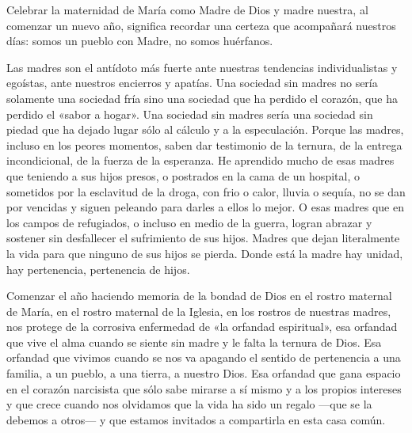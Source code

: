 \documentclass[]{article}
\begin{document}
Celebrar la maternidad de María como Madre de Dios y madre nuestra, al
comenzar un nuevo año, significa recordar una certeza que acompañará
nuestros días: somos un pueblo con Madre, no somos huérfanos.

Las madres son el antídoto más fuerte ante nuestras tendencias
individualistas y egoístas, ante nuestros encierros y apatías. Una
sociedad sin madres no sería solamente una sociedad fría sino una
sociedad que ha perdido el corazón, que ha perdido el «sabor a hogar».
Una sociedad sin madres sería una sociedad sin piedad que ha dejado
lugar sólo al cálculo y a la especulación. Porque las madres, incluso en
los peores momentos, saben dar testimonio de la ternura, de la entrega
incondicional, de la fuerza de la esperanza. He aprendido mucho de esas
madres que teniendo a sus hijos presos, o postrados en la cama de un
hospital, o sometidos por la esclavitud de la droga, con frio o calor,
lluvia o sequía, no se dan por vencidas y siguen peleando para darles a
ellos lo mejor. O esas madres que en los campos de refugiados, o incluso
en medio de la guerra, logran abrazar y sostener sin desfallecer el
sufrimiento de sus hijos. Madres que dejan literalmente la vida para que
ninguno de sus hijos se pierda. Donde está la madre hay unidad, hay
pertenencia, pertenencia de hijos.

Comenzar el año haciendo memoria de la bondad de Dios en el rostro
maternal de María, en el rostro maternal de la Iglesia, en los rostros
de nuestras madres, nos protege de la corrosiva enfermedad de «la
orfandad espiritual», esa orfandad que vive el alma cuando se siente sin
madre y le falta la ternura de Dios. Esa orfandad que vivimos cuando se
nos va apagando el sentido de pertenencia a una familia, a un pueblo, a
una tierra, a nuestro Dios. Esa orfandad que gana espacio en el corazón
narcisista que sólo sabe mirarse a sí mismo y a los propios intereses y
que crece cuando nos olvidamos que la vida ha sido un regalo ---que se
la debemos a otros--- y que estamos invitados a compartirla en esta casa
común.
\end{document}
